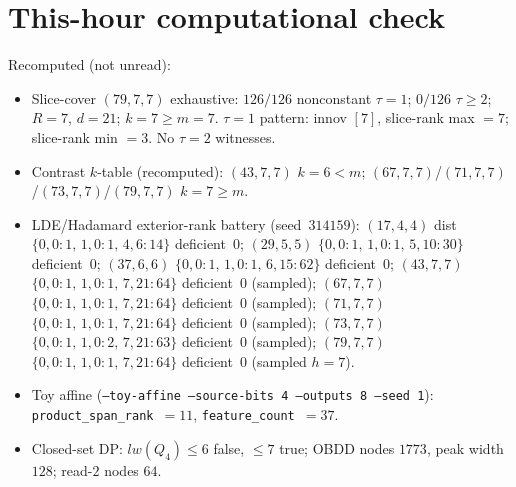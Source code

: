 \documentclass[11pt]{article}
\begin{document}
\section*{This-hour computational check}
Recomputed (not unread):
\begin{itemize}
\item Slice-cover $(79,7,7)$ exhaustive: $126/126$ nonconstant $\tau{=}1$;
  $0/126$ $\tau{\ge}2$; $R{=}7$, $d{=}21$; $k{=}7{\ge}m{=}7$.
  $\tau{=}1$ pattern: innov $[7]$, slice-rank max $=7$; slice-rank min $=3$.
  No $\tau{=}2$ witnesses.
\item Contrast $k$-table (recomputed): $(43,7,7)$ $k{=}6{<}m$;
  $(67,7,7)$/$(71,7,7)$/$(73,7,7)$/$(79,7,7)$ $k{=}7{\ge}m$.
\item LDE/Hadamard exterior-rank battery (seed~$314159$):
  $(17,4,4)$ dist $\{0,0{:}1,\,1,0{:}1,\,4,6{:}14\}$ deficient~$0$;
  $(29,5,5)$ $\{0,0{:}1,\,1,0{:}1,\,5,10{:}30\}$ deficient~$0$;
  $(37,6,6)$ $\{0,0{:}1,\,1,0{:}1,\,6,15{:}62\}$ deficient~$0$;
  $(43,7,7)$ $\{0,0{:}1,\,1,0{:}1,\,7,21{:}64\}$ deficient~$0$ (sampled);
  $(67,7,7)$ $\{0,0{:}1,\,1,0{:}1,\,7,21{:}64\}$ deficient~$0$ (sampled);
  $(71,7,7)$ $\{0,0{:}1,\,1,0{:}1,\,7,21{:}64\}$ deficient~$0$ (sampled);
  $(73,7,7)$ $\{0,0{:}1,\,1,0{:}2,\,7,21{:}63\}$ deficient~$0$ (sampled);
  $(79,7,7)$ $\{0,0{:}1,\,1,0{:}1,\,7,21{:}64\}$ deficient~$0$ (sampled $h{=}7$).
\item Toy affine (\texttt{--toy-affine --source-bits 4 --outputs 8 --seed 1}):
  \texttt{product\_span\_rank}~$=11$, \texttt{feature\_count}~$=37$.
\item Closed-set DP: $lw(Q_4)\le6$ false, $\le7$ true; OBDD nodes $1773$, peak width $128$;
  read-$2$ nodes $64$.
\end{itemize}
\end{document}
